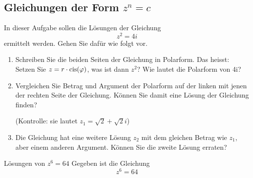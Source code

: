 \subsection{Gleichungen der Form \texorpdfstring{$z^n = c$}{z**n=c}}
\begin{LA}
    {}{}
    In dieser Aufgabe sollen die Lösungen der Gleichung 
    $$z^2=4i$$
    ermittelt werden.
    Gehen Sie dafür wie folgt vor.
    \begin{enumerate}
        \item Schreiben Sie die beiden Seiten der Gleichung in Polarform. Das heisst: Setzen Sie $z=r\cdot \mathrm{cis}(\varphi)$, was ist dann $z^2$? Wie lautet die Polarform von 4i?
        \item Vergleichen Sie Betrag und Argument der Polarform auf der linken mit jenen der rechten Seite der Gleichung. Können Sie damit eine Lösung der Gleichung finden?
        
        (Kontrolle: sie lautet $z_1=\sqrt{2}+\sqrt{2}i$)
        \item Die Gleichung hat eine weitere Lösung $z_2$ mit dem gleichen Betrag wie $z_1$, aber einem anderen Argument. Können Sie die zweite Lösung erraten? 
    \end{enumerate}


        
        
\end{LA}




\clearpage
\begin{bsp}
    {Lösungen von $z^6=64$}{}
    Gegeben ist die Gleichung
    $$z^6=64$$



    \vspace*{20cm}





\end{bsp}

